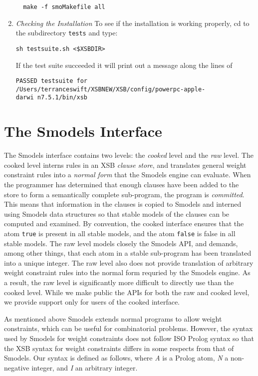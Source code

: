 \begin{enumerate}
\begin{verbatim}
  make -f smoMakefile all
\end{verbatim}
%
\item {\em Checking the Installation} 
%
To see if the installation is working properly, cd to the subdirectory
{\tt tests} and type: 

{\tt sh testsuite.sh <\$XSBDIR>}

If the test suite succeeded it will print out a message along the lines of 

\begin{small}
{\tt PASSED testsuite for /Users/terranceswift/XSBNEW/XSB/config/powerpc-apple-darwi\
n7.5.1/bin/xsb}
\end{small}

\end{enumerate}


\section{The Smodels Interface}

The Smodels interface contains two levels: the \emph{cooked} level and
the \emph{raw} level.  The cooked level interns rules in an XSB
\emph{clause store}, and translates general weight constraint rules
\cite{SiNS02} into a \emph{normal form} that the Smodels engine can
evaluate.  When the programmer has determined that enough clauses have
been added to the store to form a semantically complete sub-program,
the program is \emph{committed}.  This means that information in the
clauses is copied to Smodels and interned using Smodels data
structures so that stable models of the clauses can be computed and
examined.  By convention, the cooked interface ensures that the atom
{\tt true} is present in all stable models, and the atom {\tt false}
is false in all stable models.  The raw level models closely the
Smodels API, and demands, among other things, that each atom in a
stable sub-program has been translated into a unique integer.  The raw
level also does not provide translation of arbitrary weight constraint
rules into the normal form requried by the Smodels engine.  As a
result, the raw level is significantly more difficult to directly use
than the cooked level.  While we make public the APIs for both the raw
and cooked level, we provide support only for users of the cooked
interface.

As mentioned above Smodels extends normal programs to allow weight
constraints, which can be useful for combinatorial problems.  However,
the syntax used by Smodels for weight constraints does not follow ISO
Prolog syntax so that the XSB syntax for weight constraints differs in
some respects from that of Smodels.  Our syntax is defined as follows,
where \emph{A} is a Prolog atom, \emph{N} a non-negative integer, and
\emph{I} an arbitrary integer.

